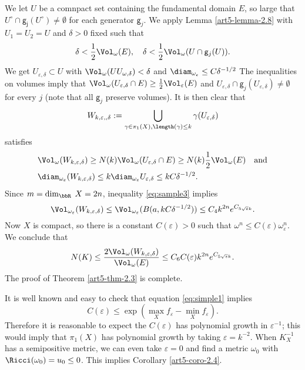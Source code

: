 We let $U$ be a  comnpact set containing the fundamental domain $E$, so large that $U^{\circ} \cap\mathsf{g_{j}}(U^{\circ}) \neq \emptyset$ for each generator $\mathsf{g}_{j}$. We apply Lemma \ref{art5-lemma-2.8} with $U_{1} = U_{2} =U$ and $\delta > 0$ fixed such that
$$
\delta < \dfrac{1}{2}\Vol_{\omega}(E), \quad \delta < \dfrac{1}{2}\Vol_{\omega}(U\cap\mathsf{g}_{j}(U)).
$$
We get $U_{\varepsilon,\delta} \subset U$ with $\Vol_{\omega}(U U_{\omega, \delta}) < \delta$ and $\diam_{\omega_{\varepsilon}} \leq C\delta^{-1/2}$ The inequalities on volumes imply that $\Vol_{\omega}(U_{\varepsilon, \delta} \cap E) \geq \frac{1}{2}\Vol_{\varepsilon}(E)$ and $U_{\varepsilon,\delta} \cap \mathsf{g}_{j}(U_{\varepsilon, \delta}) \neq \emptyset$ for every $j$ (note that all $\mathsf{g}_{j}$ preserve volumes). It is then clear that
$$
W_{k,\varepsilon,,\delta}: = \bigcup\limits_{\gamma \in \pi_{1}(X), \length(\gamma)\leq k} \gamma (U_{\varepsilon, \delta})
$$
satisfies
\begin{align*}
&\Vol_{\omega}(W_{k,\varepsilon, \delta}) \geq N(k)\Vol_{\omega}(U_{\varepsilon, \delta} \cap E) \geq N(k)\frac{1}{2}\Vol_    {\omega}(E) \quad \text{\rm and}\\
&\diam_{\omega_{\varepsilon}}(W_{k,\varepsilon,\delta}) \leq k \diam_{\omega_{\varepsilon}}U_{\varepsilon, \delta}\leq      kC\delta^{-1/2}.
\end{align*}
Since $m=\dim_{\bbR}\; X=2n$, inequality \eqref{eq:sample3} implies
$$
\Vol_{\omega_{\varepsilon}}(W_{k, \varepsilon, \delta}) \leq \Vol_{\omega_{\varepsilon}}(B(a, kC\delta^{-1/2})) \leq C_{4}k^{2n}e^{C_{5\sqrt{\varepsilon}k}}.
$$ 
Now $X$ is compact, so there is a constant $C(\varepsilon) > 0$ such that $\omega^{n} \leq C(\varepsilon)\omega_{\varepsilon}^{n}$. We conclude that
$$
N(K)\leq \dfrac{2\Vol_{\omega}(W_{k,\varepsilon,\delta})}{\Vol_{\omega}(E)} \leq C_{6}C(\varepsilon)k^{2n}e^{C_{5 \sqrt{\varepsilon}k}}.
$$
The proof of Theorem \ref{art5-thm-2.3} is complete.

\begin{remark}\label{art5-remark-2.9}
It is well known and easy to check that equation \eqref{eq:simple1} implies 
$$
C(\varepsilon) \leq \exp \left(\max\limits_{X} f_{\varepsilon} - \min\limits_{X}f_{\varepsilon}\right).
$$
Therefore it is reasonable to expect the $C(\varepsilon)$ has polynomial growth in $\varepsilon^{-1}$; this would imply that $\pi_{1}(X)$ has polynomial growth by taking $\varepsilon = k^{-2}$. When $K_{X}^{-1}$ has a semipositive metric, we can even take $\varepsilon = 0$ and find a metric $\omega_{0}$ with $\Ricci(\omega_{0}) = u_{0} \leq 0$. This implies Corollary \ref{art5-coro-2.4}.
\end{remark}

